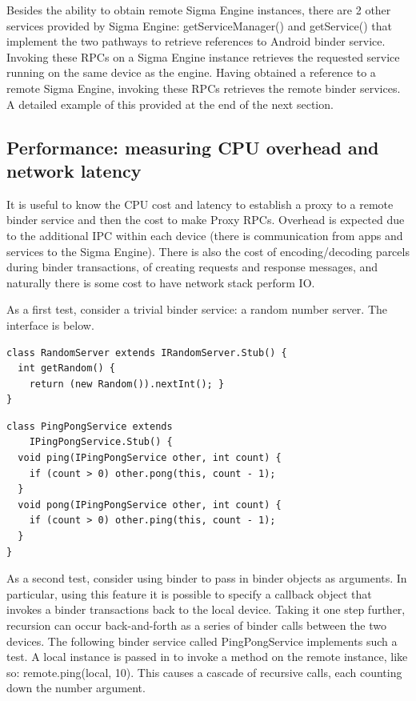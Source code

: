 \documentclass[prodmode]{acmlarge}
\begin{document}
Besides the ability to obtain remote Sigma Engine instances, there are 2 other services provided by Sigma Engine: getServiceManager() and getService() that implement the two pathways to retrieve references to Android binder service. Invoking these RPCs on a Sigma Engine instance retrieves the requested service running on the same device as the engine. Having obtained a reference to a remote Sigma Engine, invoking these RPCs retrieves the remote binder services. A detailed example of this provided at the end of the next section.

\subsection{Performance: measuring CPU overhead and network latency}
It is useful to know the CPU cost and latency to establish a proxy to a remote binder service and then the cost to make Proxy RPCs. Overhead is expected due to the additional IPC within each device (there is communication from apps and services to the Sigma Engine). There is also the cost of encoding/decoding parcels during binder transactions, of creating requests and response messages, and naturally there is some cost to have network stack perform IO.

As a first test, consider a trivial binder service: a random number server. The interface is below.
\begin{Verbatim}[samepage=true]
class RandomServer extends IRandomServer.Stub() {
  int getRandom() { 
    return (new Random()).nextInt(); }
}
\end{Verbatim}


\begin{Verbatim}[samepage=true]
class PingPongService extends
    IPingPongService.Stub() {
  void ping(IPingPongService other, int count) {
    if (count > 0) other.pong(this, count - 1);
  }
  void pong(IPingPongService other, int count) {
    if (count > 0) other.ping(this, count - 1);
  }
}
\end{Verbatim}

As a second test, consider using binder to pass in binder objects as arguments. In particular, using this feature it is possible to specify a callback object that invokes a binder transactions back to the local device. Taking it one step further, recursion can occur back-and-forth as a series of binder calls between the two devices. The following binder service called PingPongService implements such a test. A local instance is passed in to invoke a method on the remote instance, like so: remote.ping(local, 10). This causes a cascade of recursive calls, each counting down the number argument.
\end{document}
